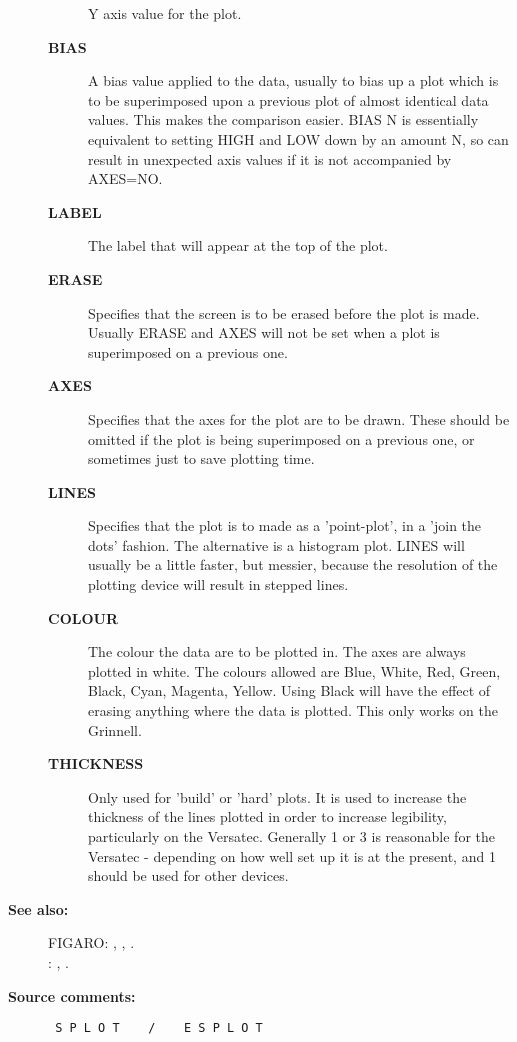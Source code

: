 \begin{description}
\begin{description}
 Y axis value for the plot.
\item [{\bf BIAS}]
 A bias value applied to the data, usually to bias
 up a plot which is to be superimposed upon a previous plot
 of almost identical data values.  This makes the comparison
 easier.  BIAS N  is essentially equivalent to setting HIGH
 and LOW down by an amount N, so can result in unexpected
 axis values if it is not accompanied by AXES=NO.
\item [{\bf LABEL}]
 The label that will appear at the top of the plot.
\item [{\bf ERASE}]
 Specifies that the screen is to be erased before the plot
 is made.  Usually ERASE and AXES will not be set when a
 plot is superimposed on a previous one.
\item [{\bf AXES}]
 Specifies that the axes for the plot are to be drawn.
 These should be omitted if the plot is being superimposed on
 a previous one, or sometimes just to save plotting time.
\item [{\bf LINES}]
 Specifies that the plot is to made as a 'point-plot',
 in a 'join the dots' fashion.  The alternative is a histogram
 plot.  LINES will usually be a little faster, but messier,
 because the resolution of the plotting device will result in
 stepped lines.
\item [{\bf COLOUR}]
 The colour the data are to be plotted in.
 The axes are always plotted in white.  The
 colours allowed are Blue, White, Red, Green, Black, Cyan,
 Magenta, Yellow.  Using Black will have the effect of
 erasing anything where the data is plotted.  This only
 works on the Grinnell.
\item [{\bf THICKNESS}]
 Only used for 'build' or 'hard' plots.  It is
 used to increase the thickness of the lines plotted in
 order to increase legibility, particularly on the Versatec.
 Generally 1 or 3 is reasonable for the Versatec - depending
 on how well set up it is at the present, and 1 should be
 used for other devices.
\end{description}

\item [{\bf See also:}]
FIGARO: , , .\\
: , .\\

\item [{\bf Source comments:}]
\begin{verbatim}
 S P L O T    /    E S P L O T


\end{verbatim}
\end{description}
